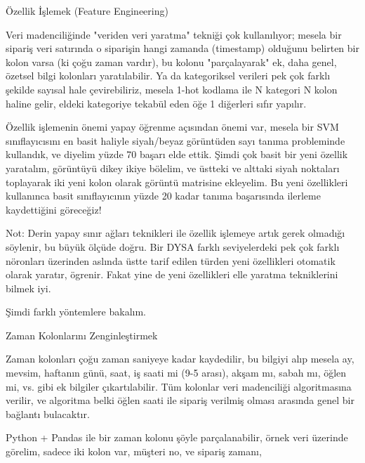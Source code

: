 \documentclass[12pt,fleqn]{article}\usepackage{../../common}
\begin{document}
Özellik İşlemek (Feature Engineering)

Veri madenciliğinde "veriden veri yaratma" tekniği çok kullanılıyor; mesela
bir sipariş veri satırında o siparişin hangi zamanda (timestamp) olduğunu
belirten bir kolon varsa (ki çoğu zaman vardır), bu kolonu "parçalayarak"
ek, daha genel, özetsel bilgi kolonları yaratılabilir. Ya da kategoriksel
verileri pek çok farklı şekilde sayısal hale çevirebiliriz, mesela 1-hot
kodlama ile N kategori N kolon haline gelir, eldeki kategoriye tekabül eden
öğe 1 diğerleri sıfır yapılır. 

Özellik işlemenin önemi yapay öğrenme açısından önemi var, mesela bir SVM
sınıflayıcısını en basit haliyle siyah/beyaz görüntüden sayı tanıma
probleminde kullandık, ve diyelim yüzde 70 başarı elde ettik. Şimdi çok
basit bir yeni özellik yaratalım, görüntüyü dikey ikiye bölelim, ve üstteki
ve alttaki siyah noktaları toplayarak iki yeni kolon olarak görüntü
matrisine ekleyelim. Bu yeni özellikleri kullanınca basit sınıflayıcının
yüzde 20 kadar tanıma başarısında ilerleme kaydettiğini göreceğiz!

Not: Derin yapay sınır ağları teknikleri ile özellik işlemeye artık gerek
olmadığı söylenir, bu büyük ölçüde doğru. Bir DYSA farklı seviyelerdeki pek
çok farklı nöronları üzerinden aslında üstte tarif edilen türden yeni
özellikleri otomatik olarak yaratır, ögrenir. Fakat yine de yeni
özellikleri elle yaratma tekniklerini bilmek iyi.

Şimdi farklı yöntemlere bakalım.

Zaman Kolonlarını Zenginleştirmek

Zaman kolonları çoğu zaman saniyeye kadar kaydedilir, bu bilgiyi alıp
mesela ay, mevsim, haftanın günü, saat, iş saati mi (9-5 arası), akşam mı,
sabah mı, öğlen mi, vs. gibi ek bilgiler çıkartılabilir. Tüm kolonlar veri
madenciliği algoritmasına verilir, ve algoritma belki öğlen saati ile
sipariş verilmiş olması arasında genel bir bağlantı bulacaktır.

Python + Pandas ile bir zaman kolonu şöyle parçalanabilir, örnek veri
üzerinde görelim, sadece iki kolon var, müşteri no, ve sipariş zamanı,
\end{document}
